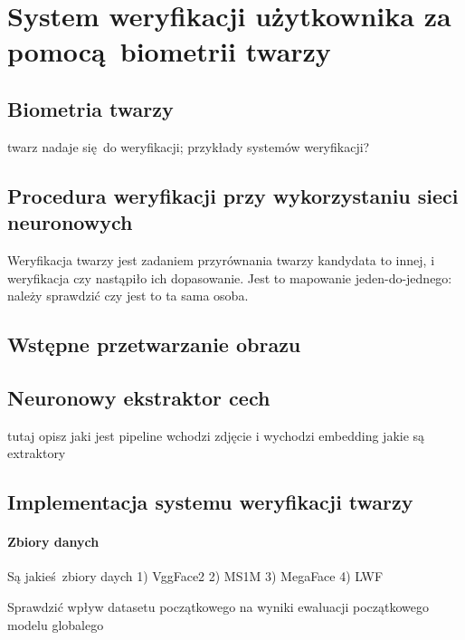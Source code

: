 

\section[verification]{System weryfikacji użytkownika za pomocą biometrii twarzy}

\subsection{Biometria twarzy}

twarz nadaje się do weryfikacji; przykłady systemów weryfikacji?

\subsection{Procedura weryfikacji przy wykorzystaniu sieci neuronowych} 

Weryfikacja twarzy jest zadaniem przyrównania twarzy
kandydata to innej, i weryfikacja czy nastąpiło ich dopasowanie. Jest to mapowanie
jeden-do-jednego: należy sprawdzić czy jest to ta sama osoba.

\subsection{Wstępne przetwarzanie obrazu}

\subsection{Neuronowy ekstraktor cech}
tutaj opisz jaki jest pipeline  
wchodzi zdjęcie i wychodzi embedding
jakie są extraktory

\subsection{Implementacja systemu weryfikacji twarzy}

\paragraph{Zbiory danych}
Są jakieś zbiory daych 
1) VggFace2
2) MS1M
3) MegaFace
4) LWF

Sprawdzić wpływ datasetu początkowego na wyniki ewaluacji początkowego modelu globalego

